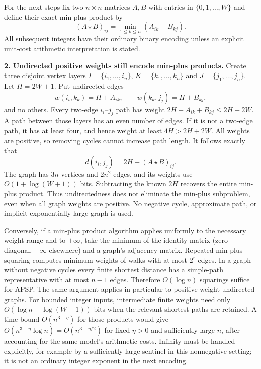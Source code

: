 \documentclass[11pt,a4paper]{article}
\numberwithin{equation}{section}
\begin{document}
For the next steps fix two $n\times n$ matrices $A,B$ with entries in
$\{0,1,\ldots,W\}$ and define their exact min-plus product by
\[
 (A\star B)_{ij}=\min_{1\leq k\leq n}(A_{ik}+B_{kj}).
\]
All subsequent integers have their ordinary binary encoding unless an
explicit unit-cost arithmetic interpretation is stated.

\textbf{2. Undirected positive weights still encode min-plus products.}
Create three disjoint vertex layers $I=\{i_1,\ldots,i_n\}$,
$K=\{k_1,\ldots,k_n\}$ and $J=\{j_1,\ldots,j_n\}$. Let
$H=2W+1$. Put undirected edges
\[
 w(i_i,k_k)=H+A_{ik},\qquad w(k_k,j_j)=H+B_{kj},
\]
and no others. Every two-edge $i_i$--$j_j$ path has weight
$2H+A_{ik}+B_{kj}\leq2H+2W$. A path between those layers has an even
number of edges. If it is not a two-edge path, it has at least four,
and hence weight at least $4H>2H+2W$. All weights are positive, so
removing cycles cannot increase path length. It follows exactly that
\begin{equation}\label{232:gadget}
 d(i_i,j_j)=2H+(A\star B)_{ij}.
\end{equation}
The graph has $3n$ vertices and $2n^2$ edges, and its weights use
$O(1+\log(W+1))$ bits. Subtracting the known $2H$ recovers the entire
min-plus product. Thus undirectedness does not eliminate the min-plus
subproblem, even when all graph weights are positive. No negative cycle,
approximate path, or implicit exponentially large graph is used.

Conversely, if a min-plus product algorithm applies uniformly to the
necessary weight range and to $+\infty$, take the minimum of the identity
matrix (zero diagonal, $+\infty$ elsewhere) and a graph's adjacency
matrix. Repeated min-plus squaring computes minimum weights of walks
with at most $2^r$ edges. In a graph without negative cycles every finite
shortest distance has a simple-path representative with at most $n-1$
edges. Therefore $O(\log n)$ squarings suffice for APSP. The same argument
applies in particular to positive-weight undirected graphs. For bounded
integer inputs, intermediate finite weights need only $O(\log n+\log
(W+1))$ bits when the relevant shortest paths are retained.
A time bound $O(n^{3-\eta})$ for those products would give
$O(n^{3-\eta}\log n)=O(n^{3-\eta/2})$ for fixed $\eta>0$ and
sufficiently large $n$, after accounting for the same model's arithmetic
costs. Infinity must be handled explicitly, for example by a sufficiently
large sentinel in this nonnegative setting; it is not an ordinary
integer exponent in the next encoding.
\end{document}
